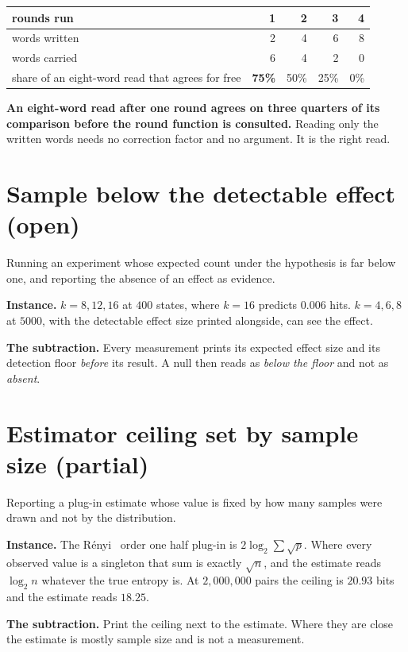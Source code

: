 \begin{center}
\begin{tabular}{@{}lrrrr@{}}
\toprule
rounds run & 1 & 2 & 3 & 4 \\
\midrule
words written & 2 & 4 & 6 & 8 \\
words carried & 6 & 4 & 2 & 0 \\
share of an eight-word read that agrees for free & \textbf{75\%} & 50\% & 25\% & 0\% \\
\bottomrule
\end{tabular}
\end{center}

\textbf{An eight-word read after one round agrees on three quarters of its comparison before the round function is consulted.} Reading only the written words needs no correction factor and no argument. It is the right read.

\section{Sample below the detectable effect (open)}

Running an experiment whose expected count under the hypothesis is far below one, and reporting the absence of an effect as evidence.

\textbf{Instance.} \(k = 8, 12, 16\) at \(400\) states, where \(k = 16\) predicts \(0.006\) hits. \(k = 4, 6, 8\) at \(5000\), with the detectable effect size printed alongside, can see the effect.

\textbf{The subtraction.} Every measurement prints its expected effect size and its detection floor \emph{before} its result. A null then reads as \emph{below the floor} and not as \emph{absent}.

\section{Estimator ceiling set by sample size (partial)}

Reporting a plug-in estimate whose value is fixed by how many samples were drawn and not by the distribution.

\textbf{Instance.} The Rényi~\cite{src:Renyi} order one half plug-in is \(2 \log_2 \sum \sqrt{p}\). Where every observed value is a singleton that sum is exactly \(\sqrt{n}\), and the estimate reads \(\log_2 n\) whatever the true entropy is. At \(2{,}000{,}000\) pairs the ceiling is \(20.93\) bits and the estimate reads \(18.25\).

\textbf{The subtraction.} Print the ceiling next to the estimate. Where they are close the estimate is mostly sample size and is not a measurement.

